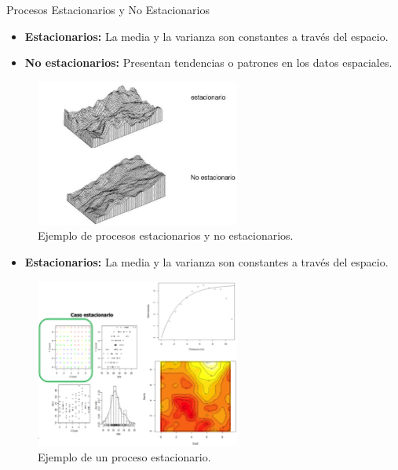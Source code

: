 \documentclass[
  10pt,
  ignorenonframetext,
]{beamer}
\providecommand{\tightlist}{%
  \setlength{\itemsep}{0pt}\setlength{\parskip}{0pt}}
\begin{document}
\begin{frame}{Procesos Estacionarios y No Estacionarios}
\begin{itemize}
\tightlist
\item
  \textbf{Estacionarios:} La media y la varianza son constantes a través
  del espacio.
\item
  \textbf{No estacionarios:} Presentan tendencias o patrones en los
  datos espaciales.
\end{itemize}

\begin{figure}
    \centering
    \includegraphics[width=0.6\textwidth]{./imagenes/figura3.jpg}
    \caption{Ejemplo de procesos estacionarios y no estacionarios.}
\end{figure}
\end{frame}

\begin{frame}
\begin{itemize}
\tightlist
\item
  \textbf{Estacionarios:} La media y la varianza son constantes a través
  del espacio.
\end{itemize}

\begin{figure}
    \centering
    \includegraphics[width=0.6\textwidth]{./imagenes/figura3a.png}
    \caption{Ejemplo de un proceso estacionario.}
\end{figure}
\end{frame}
\end{document}
